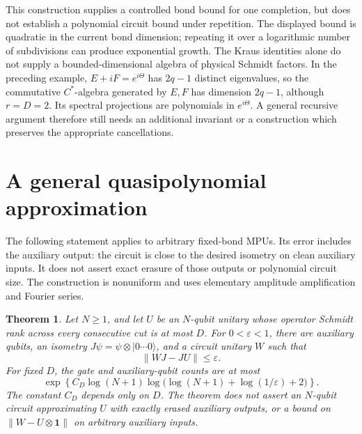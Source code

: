 \documentclass[11pt]{article}
\newtheorem{theorem}[proposition]{Theorem}
\newcommand{\id}{\mathbf 1}
\begin{document}
This construction supplies a controlled bond bound for one completion,
but does not establish a polynomial circuit bound under repetition.
The displayed bound is quadratic in the current bond dimension;
repeating it over a logarithmic number of subdivisions can produce
exponential growth. The Kraus identities alone do not supply a
bounded-dimensional algebra of physical Schmidt factors. In the
preceding example, $E+iF=e^{i\Theta}$ has $2q-1$ distinct eigenvalues,
so the commutative $C^*$-algebra generated by $E,F$ has dimension
$2q-1$, although $r=D=2$. Its spectral projections are polynomials
in $e^{i\Theta}$. A general recursive argument therefore still needs
an additional invariant or a construction which preserves the
appropriate cancellations.


\section{A general quasipolynomial approximation}

The following statement applies to arbitrary fixed-bond MPUs. Its error
includes the auxiliary output: the circuit is close to the desired
isometry on clean auxiliary inputs. It does not assert exact erasure of
those outputs or polynomial circuit size. The construction is nonuniform
and uses elementary amplitude amplification and Fourier series.

\begin{theorem}\label{thm:mpu_general_quasipolynomial_approximation}
Let $N\geq1$, and let $U$ be an $N$-qubit unitary whose operator Schmidt rank across every
consecutive cut is at most $D$. For $0<\varepsilon<1$, there are auxiliary
qubits, an isometry $J\psi=\psi\otimes|0\cdots0\rangle$, and a circuit
unitary $W$ such that
\[
 \|WJ-JU\|\leq\varepsilon.
\]
For fixed $D$, the gate and auxiliary-qubit counts are at most
\[
 \exp\!\left\{C_D\log(N+1)
      \log\bigl(\log(N+1)+\log(1/\varepsilon)+2\bigr)\right\}.
\]
The constant $C_D$ depends only on $D$. The theorem does not assert an
$N$-qubit circuit approximating $U$ with exactly erased auxiliary outputs,
or a bound on $\|W-U\otimes\id\|$ on arbitrary auxiliary inputs.
\end{theorem}
\end{document}
